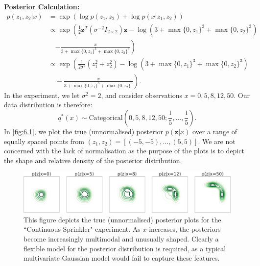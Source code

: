 \documentclass[honours,12pt]{unswthesis}
\numberwithin{equation}{section}
\theoremstyle{definition}
\begin{document}
\textbf{Posterior Calculation:}
\begin{equation}
\begin{aligned}
p(z_1,z_2|x)&= \exp(\log p(z_1,z_2)+\log p(x|z_1,z_2))\\
&\propto\exp\left(\frac12\bm{z}^T(\sigma^{-2}I_{2\times 2})\bm{z}-\log (3+\max\{0,z_1\}^3+\max\{0,z_2\}^3)\right.\\
&\quad\left.-\frac{x}{3+\max\{0,z_1\}^3+\max\{0,z_2\}^3}\right)\\
&\propto \exp\left(\frac{1}{2\sigma^2}(z_1^2+z_2^2)-\log (3+\max\{0,z_1\}^3+\max\{0,z_2\}^3)\right.\\
&\left.\quad-\frac{x}{3+\max\{0,z_1\}^3+\max\{0,z_2\}^3}\right).
\end{aligned}
\end{equation}
In the experiment, we let $\sigma^2=2$, and consider observations $x=0,5,8,12,50$. Our data distribution is therefore:
\[q^*(x)\sim \text{Categorical}\left(0,5,8,12,50;\frac{1}{5},\dots,\frac{1}{5}\right).\] In \autoref{fig:6.1}, we plot the true (unnormalised) posterior $p(\bm{z}|x)$ over a range of equally spaced points from $(z_1,z_2)=[(-5,-5),\dots, (5,5)]$. We are not concerned with the lack of normalisation as the purpose of the plots is to depict the shape and relative density of the posterior distribution.\\
\begin{figure}[h]
\includegraphics[width=\textwidth]{sprinklertrue.png}
\caption{\small This figure depicts the true (unnormalised) posterior plots for the ``Continuous Sprinkler" experiment. As $x$ increases, the posteriors become increasingly multimodal and unusually shaped. Clearly a flexible model for the posterior distribution is required, as a typical multivariate Gaussian model would fail to capture these features.}
\label{fig:6.1}
\end{figure}
\end{document}
